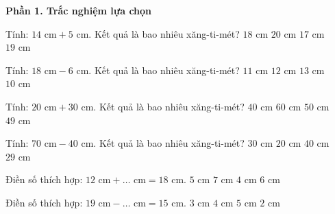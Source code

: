 \textbf{Phần 1. Trắc nghiệm lựa chọn}

\begin{ex} %
Tính: $14\text{ cm} + 5\text{ cm}$. Kết quả là bao nhiêu xăng-ti-mét?
\choice
{$18\text{ cm}$}
{$20\text{ cm}$}
{$17\text{ cm}$}
{\True $19\text{ cm}$}
\end{ex}

\begin{ex} %
Tính: $18\text{ cm} - 6\text{ cm}$. Kết quả là bao nhiêu xăng-ti-mét?
\choice
{$11\text{ cm}$}
{\True $12\text{ cm}$}
{$13\text{ cm}$}
{$10\text{ cm}$}
\end{ex}

\begin{ex} %
Tính: $20\text{ cm} + 30\text{ cm}$. Kết quả là bao nhiêu xăng-ti-mét?
\choice
{$40\text{ cm}$}
{$60\text{ cm}$}
{\True $50\text{ cm}$}
{$49\text{ cm}$}
\end{ex}

\begin{ex} %
Tính: $70\text{ cm} - 40\text{ cm}$. Kết quả là bao nhiêu xăng-ti-mét?
\choice
{\True $30\text{ cm}$}
{$20\text{ cm}$}
{$40\text{ cm}$}
{$29\text{ cm}$}
\end{ex}

\begin{ex} %
Điền số thích hợp: $12\text{ cm} + \dots\text{ cm} = 18\text{ cm}$.
\choice
{$5\text{ cm}$}
{$7\text{ cm}$}
{$4\text{ cm}$}
{\True $6\text{ cm}$}
\end{ex}

\begin{ex} %
Điền số thích hợp: $19\text{ cm} - \dots\text{ cm} = 15\text{ cm}$.
\choice
{$3\text{ cm}$}
{\True $4\text{ cm}$}
{$5\text{ cm}$}
{$2\text{ cm}$}
\end{ex}

